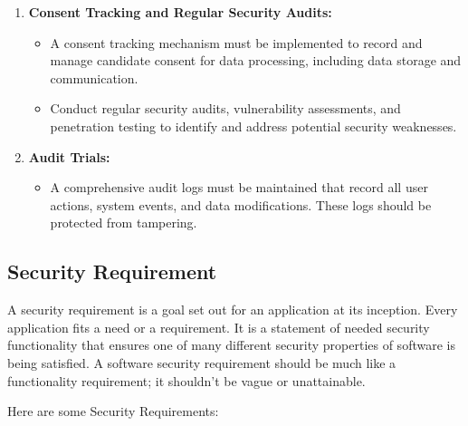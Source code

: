 \begin{enumerate}
\begin{itemize}
		\end{itemize}
    \item \textbf{Consent Tracking and Regular Security Audits:}
		\begin{itemize}
			\item A consent tracking mechanism must be implemented to record and manage candidate consent for data processing, including data storage and communication.
			\item Conduct regular security audits, vulnerability assessments, and penetration testing to identify and address potential security weaknesses.
		\end{itemize}
    \item \textbf{Audit Trials:}
		\begin{itemize}
			\item A comprehensive audit logs must be maintained that record all user actions, system events, and data modifications. These logs should be protected from tampering.
		\end{itemize}
\end{enumerate}


\subsection{Security Requirement}

A security requirement is a goal set out for an application at its inception. Every application fits a need or a requirement. It is a statement of needed security functionality that ensures one of many different security properties of software is being satisfied. A software security requirement should be much like a functionality requirement; it shouldn’t be vague or unattainable.

Here are some Security Requirements:

